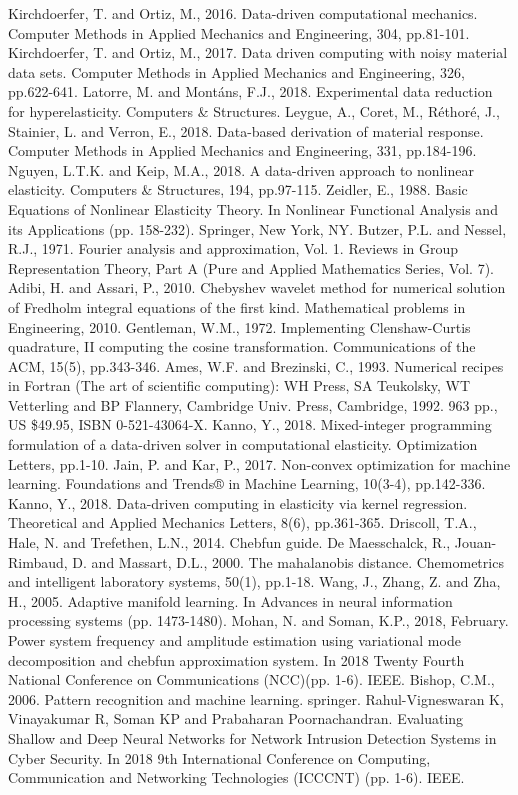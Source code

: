 \documentclass[conference]{IEEEtran}
\begin{document}
\begin{thebibliography}{00}
 Kirchdoerfer, T. and Ortiz, M., 2016. Data-driven computational mechanics. Computer Methods in Applied Mechanics and Engineering, 304, pp.81-101.
 Kirchdoerfer, T. and Ortiz, M., 2017. Data driven computing with noisy material data sets. Computer Methods in Applied Mechanics and Engineering, 326, pp.622-641.
 Latorre, M. and Montáns, F.J., 2018. Experimental data reduction for hyperelasticity. Computers \& Structures.
 Leygue, A., Coret, M., Réthoré, J., Stainier, L. and Verron, E., 2018. Data-based derivation of material response. Computer Methods in Applied Mechanics and Engineering, 331, pp.184-196.
 Nguyen, L.T.K. and Keip, M.A., 2018. A data-driven approach to nonlinear elasticity. Computers \& Structures, 194, pp.97-115.
 Zeidler, E., 1988. Basic Equations of Nonlinear Elasticity Theory. In Nonlinear Functional Analysis and its Applications (pp. 158-232). Springer, New York, NY.
 Butzer, P.L. and Nessel, R.J., 1971. Fourier analysis and approximation, Vol. 1. Reviews in Group Representation Theory, Part A (Pure and Applied Mathematics Series, Vol. 7).
 Adibi, H. and Assari, P., 2010. Chebyshev wavelet method for numerical solution of Fredholm integral equations of the first kind. Mathematical problems in Engineering, 2010.
 Gentleman, W.M., 1972. Implementing Clenshaw-Curtis quadrature, II computing the cosine transformation. Communications of the ACM, 15(5), pp.343-346.
 Ames, W.F. and Brezinski, C., 1993. Numerical recipes in Fortran (The art of scientific computing): WH Press, SA Teukolsky, WT Vetterling and BP Flannery, Cambridge Univ. Press, Cambridge, 1992. 963 pp., US \$49.95, ISBN 0-521-43064-X.
 Kanno, Y., 2018. Mixed-integer programming formulation of a data-driven solver in computational elasticity. Optimization Letters, pp.1-10.
 Jain, P. and Kar, P., 2017. Non-convex optimization for machine learning. Foundations and Trends® in Machine Learning, 10(3-4), pp.142-336.
 Kanno, Y., 2018. Data-driven computing in elasticity via kernel regression. Theoretical and Applied Mechanics Letters, 8(6), pp.361-365.
 Driscoll, T.A., Hale, N. and Trefethen, L.N., 2014. Chebfun guide.
 De Maesschalck, R., Jouan-Rimbaud, D. and Massart, D.L., 2000. The mahalanobis distance. Chemometrics and intelligent laboratory systems, 50(1), pp.1-18.
 Wang, J., Zhang, Z. and Zha, H., 2005. Adaptive manifold learning. In Advances in neural information processing systems (pp. 1473-1480).
 Mohan, N. and Soman, K.P., 2018, February. Power system frequency and amplitude estimation using variational mode decomposition and chebfun approximation system. In 2018 Twenty Fourth National Conference on Communications (NCC)(pp. 1-6). IEEE.
 Bishop, C.M., 2006. Pattern recognition and machine learning. springer.
  Rahul-Vigneswaran K, Vinayakumar R, Soman KP and Prabaharan Poornachandran. Evaluating Shallow and Deep Neural Networks for Network Intrusion Detection Systems in Cyber Security. In 2018 9th International Conference on Computing, Communication and Networking Technologies (ICCCNT) (pp. 1-6). IEEE. 


\end{thebibliography}
\end{document}
